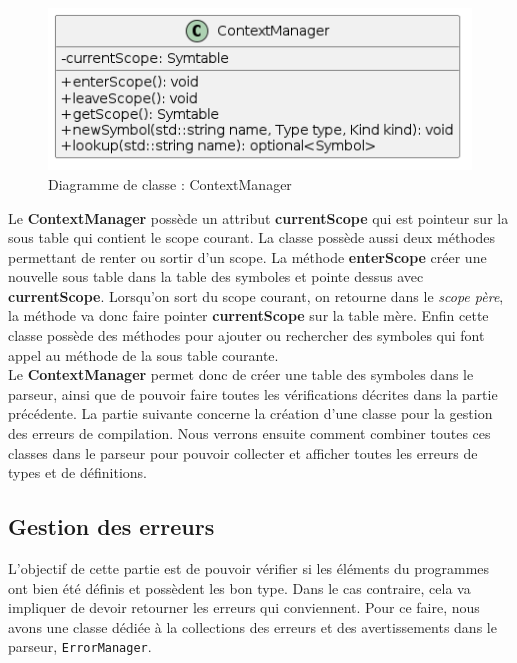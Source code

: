 \documentclass[a4paper]{article}%
\begin{document}
\begin{figure}[h!]
  \begin{center}
  \includegraphics[scale=0.5]{../ressources/diagrams/contextManager.png}
  \caption{Diagramme de classe : ContextManager}
  \end{center}
\end{figure}

Le \textbf{ContextManager} possède un attribut \textbf{currentScope} qui est pointeur sur
la sous table qui contient le scope courant. La classe possède aussi deux
méthodes permettant de renter ou sortir d'un scope. La méthode
\textbf{enterScope} créer une nouvelle sous table dans la table des symboles et
pointe dessus avec \textbf{currentScope}. Lorsqu'on sort du scope courant, on
retourne dans le \textit{scope père}, la méthode va donc faire pointer
\textbf{currentScope} sur la table mère. Enfin cette classe possède des méthodes
pour ajouter ou rechercher des symboles qui font appel au méthode de la sous
table courante.\\

Le \textbf{ContextManager} permet donc de créer une table des symboles dans le
parseur, ainsi que de pouvoir faire toutes les vérifications décrites dans la
partie précédente. La partie suivante concerne la création d'une classe pour la
gestion des erreurs de compilation. Nous verrons ensuite comment combiner toutes
ces classes dans le parseur pour pouvoir collecter et afficher toutes les
erreurs de types et de définitions.

\subsection{Gestion des erreurs}

L'objectif de cette partie est de pouvoir vérifier si les éléments du programmes
ont bien été définis et possèdent les bon type. Dans le cas contraire, cela va
impliquer de devoir retourner les erreurs qui conviennent. Pour ce faire, nous
avons une classe dédiée à la collections des erreurs et des avertissements dans
le parseur, \lstinline{ErrorManager}.
\end{document}
